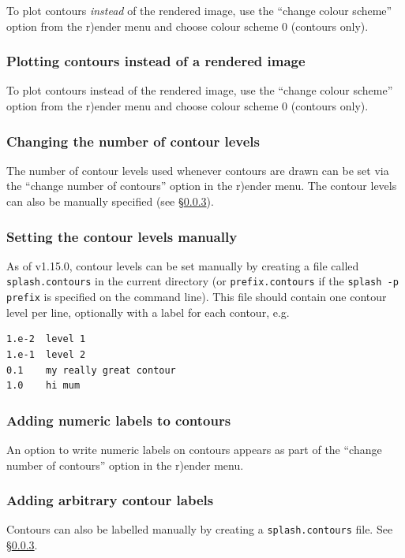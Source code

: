 \documentclass[a4paper,10pt]{article}
\begin{document}
 To plot contours \emph{instead} of the rendered image, use the ``change colour scheme'' option from the r)ender menu and choose colour scheme 0 (contours only). 

\subsubsection{ Plotting contours instead of a rendered image}
To plot contours instead of the rendered image, use the ``change colour scheme'' option from the r)ender menu and choose colour scheme 0 (contours only). 

\subsubsection{ Changing the number of contour levels}
 The number of contour levels used whenever contours are drawn can be set via the ``change number of contours'' option in the r)ender menu. The contour levels can also be manually specified (see \S\ref{sec:contoursmanual}).

\subsubsection{ Setting the contour levels manually}
\label{sec:contoursmanual}
 As of v1.15.0, contour levels can be set manually by creating a file called \verb+splash.contours+ in the current directory (or \verb+prefix.contours+ if the \verb+splash -p prefix+ is specified on the command line). This file should contain one contour level per line, optionally with a label for each contour, e.g.
\begin{verbatim}
1.e-2  level 1
1.e-1  level 2
0.1    my really great contour
1.0    hi mum
\end{verbatim}

\subsubsection{ Adding numeric labels to contours}
 An option to write numeric labels on contours appears as part of the ``change number of contours'' option in the r)ender menu.

\subsubsection{ Adding arbitrary contour labels}
 Contours can also be labelled manually by creating a \verb+splash.contours+ file. See \S\ref{sec:contoursmanual}.
\end{document}
